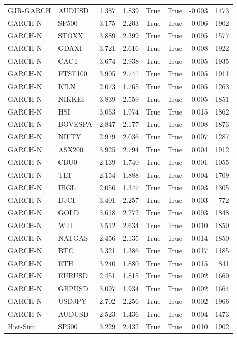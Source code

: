 \begin{table}[H]
\begin{tabular}{llrrrrrr}
GJR-GARCH & AUDUSD & 1.387 & 1.839 & True & True & -0.003 & 1473 \\
GARCH-N & SP500 & 3.175 & 2.203 & True & True & 0.006 & 1902 \\
GARCH-N & STOXX & 3.889 & 2.399 & True & True & 0.005 & 1577 \\
GARCH-N & GDAXI & 3.721 & 2.616 & True & True & 0.008 & 1922 \\
GARCH-N & CACT & 3.674 & 2.938 & True & True & 0.005 & 1935 \\
GARCH-N & FTSE100 & 3.905 & 2.741 & True & True & 0.005 & 1911 \\
GARCH-N & ICLN & 2.073 & 1.765 & True & True & 0.005 & 1263 \\
GARCH-N & NIKKEI & 3.839 & 2.559 & True & True & 0.005 & 1851 \\
GARCH-N & HSI & 3.053 & 1.974 & True & True & 0.015 & 1862 \\
GARCH-N & BOVESPA & 2.847 & 2.177 & True & True & 0.008 & 1873 \\
GARCH-N & NIFTY & 2.979 & 2.036 & True & True & 0.007 & 1287 \\
GARCH-N & ASX200 & 3.925 & 2.794 & True & True & 0.004 & 1912 \\
GARCH-N & CBU0 & 2.139 & 1.740 & True & True & 0.001 & 1055 \\
GARCH-N & TLT & 2.154 & 1.888 & True & True & 0.004 & 1709 \\
GARCH-N & IBGL & 2.056 & 1.347 & True & True & 0.003 & 1305 \\
GARCH-N & DJCI & 3.401 & 2.257 & True & True & 0.003 & 772 \\
GARCH-N & GOLD & 3.618 & 2.272 & True & True & 0.003 & 1848 \\
GARCH-N & WTI & 3.512 & 2.634 & True & True & 0.010 & 1850 \\
GARCH-N & NATGAS & 2.456 & 2.135 & True & True & 0.014 & 1850 \\
GARCH-N & BTC & 3.321 & 1.386 & True & True & 0.017 & 1185 \\
GARCH-N & ETH & 3.240 & 1.880 & True & True & 0.015 & 841 \\
GARCH-N & EURUSD & 2.451 & 1.815 & True & True & 0.002 & 1660 \\
GARCH-N & GBPUSD & 3.097 & 1.934 & True & True & 0.002 & 1664 \\
GARCH-N & USDJPY & 2.702 & 2.256 & True & True & 0.002 & 1966 \\
GARCH-N & AUDUSD & 2.523 & 1.436 & True & True & 0.004 & 1473 \\
Hist-Sim & SP500 & 3.229 & 2.432 & True & True & 0.010 & 1902 \\

\end{tabular}
\end{table}
